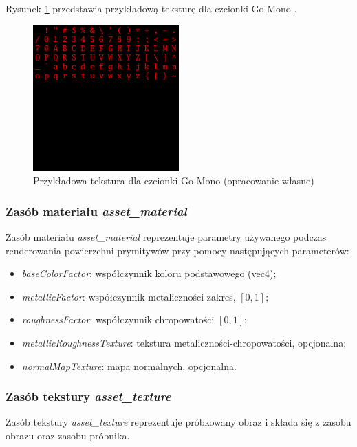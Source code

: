 Rysunek \ref{font_texture} przedstawia przykładową teksturę dla czcionki Go-Mono \cite{GOMONOFONT}.
\begin{figure}[htbp]
	\centering
	\includegraphics[width=0.5\textwidth]{images/font_texture.png}
	\caption{Przykładowa tekstura dla czcionki Go-Mono \cite{GOMONOFONT} (opracowanie własne)}
	\label{font_texture}
\end{figure}

\subsubsection{Zasób materiału \textit{asset\_material}}
Zasób materiału \textit{asset\_material} reprezentuje parametry używanego podczas renderowania powierzchni
prymitywów przy pomocy następujących parameterów:
\begin{itemize}
	\item \textit{baseColorFactor}: współczynnik koloru podstawowego (vec4);
	\item \textit{metallicFactor}: współczynnik metaliczności zakres, $\left[0,1\right]$;
	\item \textit{roughnessFactor}: współczynnik chropowatości $\left[0,1\right]$;
	\item \textit{metallicRoughnessTexture}: tekstura metaliczności-chropowatości, opcjonalna;
	\item \textit{normalMapTexture}: mapa normalnych, opcjonalna.
\end{itemize}

\subsubsection{Zasób tekstury \textit{asset\_texture}}
Zasób tekstury \textit{asset\_texture} reprezentuje próbkowany obraz i składa się z zasobu obrazu oraz zasobu próbnika.

